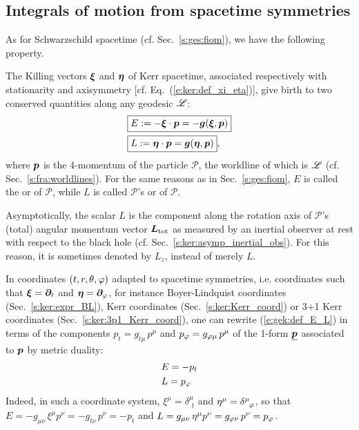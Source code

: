 \subsection{Integrals of motion from spacetime symmetries} \label{s:gek:int_motion_sym}

As for Schwarzschild spacetime (cf. Sec.~\ref{s:ges:fiom}), we have the following
property.
\begin{greybox}
The Killing vectors $\bm{\xi}$ and $\bm{\eta}$ of Kerr spacetime,
associated respectively with
stationarity and axisymmetry [cf. Eq.~(\ref{e:ker:def_xi_eta})],
give birth to two conserved quantities
along any geodesic $\mathscr{L}$:
\begin{subequations}
\label{e:gek:def_E_L}
\begin{align}
& \fbox{$\displaystyle E := - \bm{\xi}\cdot \bm{p} = - \bm{g}(\bm{\xi},\bm{p}) $} \label{e:gek:def_E} \\
& \fbox{$\displaystyle L := \bm{\eta}\cdot \bm{p} = \bm{g}(\bm{\eta},\bm{p}) $} , \label{e:gek:def_L}
\end{align}
\end{subequations}
where $\bm{p}$ is the 4-momentum of the particle $\mathscr{P}$, the worldline of which is $\mathscr{L}$ (cf. Sec.~\ref{s:fra:worldlines}).
For the same reasons as in Sec.~\ref{s:ges:fiom}, $E$ is called
the 
or  of $\mathscr{P}$,
while $L$ is called $\mathscr{P}$'s 
or 
of $\mathscr{P}$.
\end{greybox}
\begin{remark}
Asymptotically, the scalar $L$ is the
component along the rotation axis of $\mathscr{P}$'s (total) angular momentum vector $\bm{L}_{\rm tot}$
as measured by an inertial observer at rest with respect to the black hole (cf. Sec.~\ref{s:ker:asymp_inertial_obs}).
For this reason, it is sometimes denoted by $L_z$, instead of merely $L$.
\end{remark}

In coordinates $(t,r,\theta,\varphi)$ adapted to spacetime symmetries,
i.e. coordinates such that $\bm{\xi} = \bm{\partial}_t$ and $\bm{\eta}=\bm{\partial}_\varphi$,
for instance Boyer-Lindquist coordinates (Sec.~\ref{s:ker:expr_BL}),
Kerr coordinates (Sec.~\ref{s:ker:Kerr_coord}) or 3+1 Kerr coordinates
(Sec.~\ref{s:ker:3p1_Kerr_coord}), one can rewrite
(\ref{e:gek:def_E_L})
in terms of the components $p_t = g_{t\mu} \, p^\mu$ and $p_\varphi = g_{\varphi\mu} \, p^\mu$
of the 1-form $\underline{\bm{p}}$ associated to $\bm{p}$ by metric duality:
\begin{subequations}
\label{e:gek:E_pt_L_pph}
\begin{align}
& E = - p_t \\
& L = p_\varphi
\end{align}
\end{subequations}
Indeed, in such a coordinate system, $\xi^\mu =  \delta^\mu_{\ \, t}$
and $\eta^\mu = \delta^\mu_{\ \, \varphi}$, so that $E = -g_{\mu\nu} \, \xi^\mu p^\nu = -g_{t\nu} \, p^\nu = -p_t$
and $L = g_{\mu\nu} \, \eta^\mu p^\nu = g_{\varphi\nu} \, p^\nu = p_\varphi$.

